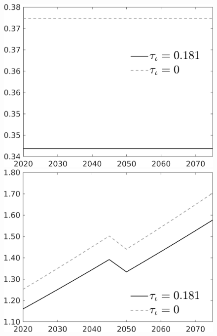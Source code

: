 \documentclass[12pt]{article}
\begin{document}
\begin{figure}[h!!]
\begin{minipage}[]{0.32\textwidth}
	\end{minipage}	
	\begin{minipage}[]{0.32\textwidth}
		\includegraphics[width=1\textwidth]{../../codding_model/own_basedOnFried/optimalPol_010922_revision/figures/all_13Sept22/CompTauf_bytaul_Reg0_hh_spillover0_nsk1_xgr0_knspil0_sep0_LFlimit1_emsbase0_countec0_GovRev0_etaa0.79_lgd1.png}
	\end{minipage}	
	\begin{minipage}[]{0.32\textwidth}
		\includegraphics[width=1\textwidth]{../../codding_model/own_basedOnFried/optimalPol_010922_revision/figures/all_13Sept22/CompTauf_bytaul_Reg0_C_spillover0_nsk1_xgr0_knspil0_sep0_LFlimit1_emsbase0_countec0_GovRev0_etaa0.79_lgd1.png}

\end{minipage}
\end{figure}
\end{document}
